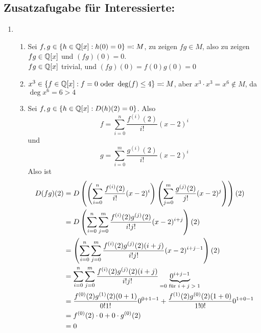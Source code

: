 \documentclass[sectionformat = aufgabe]{gadsescript}
\begin{document}
\subsection*{\textbf{Zusatzafugabe für Interessierte:}}
\begin{enumerate}[label=(\alph*)]
	\item 
		\begin{enumerate}[label=(\roman*)]
			\item Sei $ f, g \in \left\{ h \in \mathbb{Q} [x] : h(0) = 0 \right\} \eqcolon M $, zu zeigen $ fg \in M $, also zu zeigen $ fg \in \mathbb{Q} [x] $ und $ (fg)(0) = 0 $.\\
				$ fg \in \mathbb{Q} [x] $ trivial, und $ (fg)(0) = f(0) g(0) = 0 $ 
			\item $ x^3 \in \left\{ f \in \mathbb{Q} [x] : f = 0 \text{ oder } \deg(f) \leq 4 \right\} \eqcolon M $, aber $ x^3 \cdot x^3 = x^6 \not\in M $, da $ \deg x^6 = 6 > 4 $
			\item Sei $ f, g \in \left\{ h \in \mathbb{Q} [x] : D(h)(2) = 0 \right\}  $.
				Also
				\[
					f = \sum_{i=0}^{n} \frac{f^{(i)} (2)}{ i! } (x - 2)^{i} 
				\]
				und
				\[
					g = \sum_{i=0}^{m} \frac{g^{(i)} (2)}{ i! } (x - 2)^{i}  
				\]
				Also ist
				\begin{align*}
					D(fg)(2) &= D\left(\left( \sum_{i=0}^{n} \frac{f^{(i)} (2)}{ i! } (x - 2)^i  \right) \left( \sum_{j=0}^{m} \frac{g^{(j)} (2)}{ j!} (x - 2)^j  \right)\right)(2)  \\
					&= D \left(\sum_{i=0}^{n} \sum_{j=0}^{m} \frac{f^{(i)}(2) g^{(j)} (2) }{ i!j! } (x - 2)^{i + j}\right)(2) \\
					&= \left(\sum_{i=0}^{n} \sum_{j=0}^{m} \frac{f^{(i)}(2) g^{(j)} (2) ( i + j ) }{ i!j! } (x - 2)^{i + j - 1}\right)(2) \\
					&= \sum_{i=0}^{n} \sum_{j=0}^{m} \frac{f^{(i)}(2) g^{(j)} (2) ( i + j ) }{ i!j! } \underbrace{0^{i + j - 1}}_{= 0 \text{ für $ i + j > 1 $}}  \\
					&= \frac{f^{(0)}(2) g^{(1)} (2) ( 0 + 1 ) }{ 0!1! } 0^{0 + 1 - 1} + \frac{f^{(1)}(2) g^{(0)} (2) ( 1 + 0 ) }{ 1!0! } 0^{1 + 0 - 1} \\
					&= f^{(0)}(2) \cdot 0 + 0 \cdot g^{(0)} (2) \\
					&= 0 \\
				\end{align*}
		\end{enumerate}
\end{enumerate}
\end{document}
